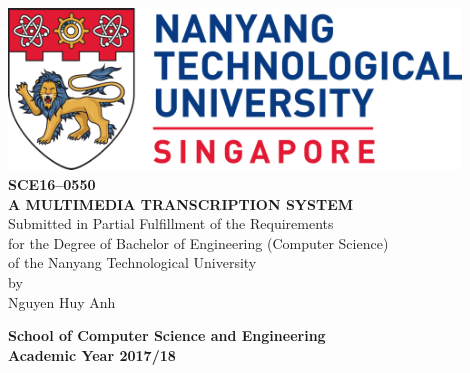 \begin{titlepage}
\begin{center}

\includegraphics[width=0.9\textwidth]{../images/ntu_logo.png}
\\[4cm]

\uppercase{
    \textbf{SCE16--0550}\\
    \textbf{A Multimedia Transcription System}
}\\[4cm]

Submitted in Partial Fulfillment of the Requirements\\
for the Degree of Bachelor of Engineering (Computer Science)\\
of the Nanyang Technological University\\[1cm]
by\\[1cm]
Nguyen Huy Anh 

\vfill

\textbf{School of Computer Science and Engineering}\\
\textbf{Academic Year 2017/18}

\end{center}
\end{titlepage}
